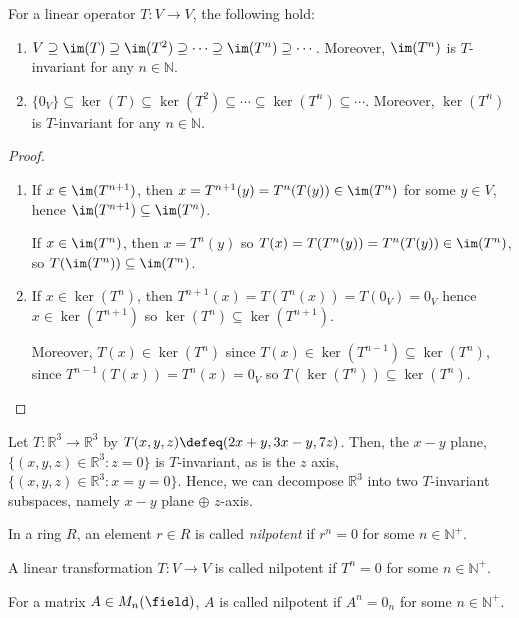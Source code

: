\begin{proposition}
    For a linear operator $T : V \to V$, the following hold:
    \begin{enumerate}
        \item $V \supseteq \im(T) \supseteq \im(T^2) \supseteq \cdots \supseteq \im(T^n) \supseteq  \cdots$. Moreover, $\im(T^n)$ is $T$-invariant for any $n \in \mathbb{N}$.
        \item $\{0_V\} \subseteq \ker(T) \subseteq \ker(T^2) \subseteq \cdots \subseteq \ker(T^n) \subseteq \cdots$. Moreover, $\ker(T^n)$ is $T$-invariant for any $n \in \mathbb{N}$.
    \end{enumerate}
\end{proposition}

\begin{proof}
    \begin{enumerate}
        \item If $x \in \im(T^{n+1})$, then $x = T^{n+1}(y) = T^{n}(T(y)) \in \im(T^n)$ for some $y \in V$, hence $\im(T^{n+1}) \subseteq \im(T^{n})$.
        
         If $x \in \im(T^n)$, then $x = T^{n}(y)$ so $T(x) = T(T^{n}(y)) = T^{n}(T(y)) \in \im (T^n)$, so $T(\im(T^n)) \subseteq \im(T^n)$.

         \item If $x \in \ker(T^n)$, then $T^{n+1}(x) = T(T^n(x)) = T(0_V) = 0_V$ hence $x \in \ker(T^{n+1})$ so $\ker(T^{n}) \subseteq \ker(T^{n+1})$.
         
         Moreover, $T(x) \in \ker(T^n)$ since $T(x) \in \ker (T^{n-1}) \subseteq \ker(T^n)$, since $T^{n-1}(T(x)) = T^{n}(x) = 0_V$ so $T(\ker(T^n)) \subseteq \ker(T^{n})$.
    \end{enumerate}
\end{proof}

\begin{example}
    Let $T: \mathbb{R}^3 \to \mathbb{R}^3$ by $T(x, y, z) \defeq (2x +y, 3x - y, 7z)$. Then, the $x-y$ plane, $\{(x, y, z) \in \mathbb{R}^3: z = 0\}$ is $T$-invariant, as is the $z$ axis, $\{(x, y, z)\in\mathbb{R}^3: x = y = 0\}$. Hence, we can decompose $\mathbb{R}^3$ into two $T$-invariant subspaces, namely $x-y$ plane $\oplus$ $z$-axis.
\end{example}

\begin{definition}[Nilpotent]
    In a ring $R$, an element $r \in R$ is called \emph{nilpotent} if $r^n = 0$ for some $n \in \mathbb{N}^+$. 
    
    A linear transformation $T: V \to V$ is called nilpotent if $T^n = 0$ for some $n \in \mathbb{N}^+$.\footnotemark

    For a matrix $A \in M_n(\field)$, $A$ is called nilpotent if $A^n = 0_n$ for some $n \in \mathbb{N}^+$.
\end{definition}

